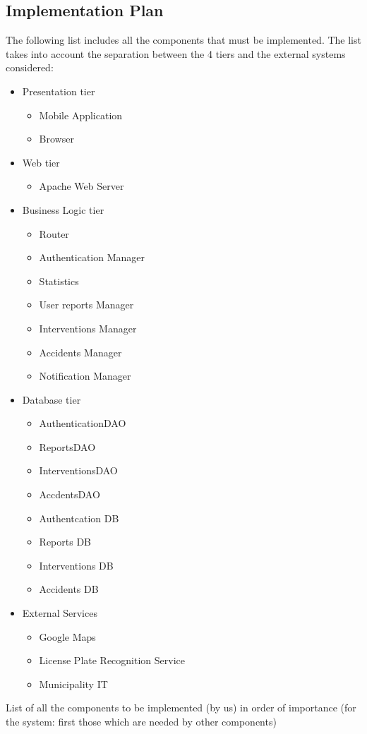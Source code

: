 \documentclass[../DD.tex]{subfiles}
\begin{document}
\subsection{Implementation Plan\label{5.2.1}}
The following list includes all the components that must be implemented. The list takes into account the separation between the 4 tiers and the external systems considered:
\begin{itemize}
	\item Presentation tier
	\begin{itemize}
		\item Mobile Application
		\item Browser
	\end{itemize}
\item Web tier
	\begin{itemize}
		\item Apache Web Server
	\end{itemize}
\item Business Logic tier
	\begin{itemize}
		\item Router
		\item Authentication Manager
		\item Statistics
		\item User reports Manager
		\item Interventions Manager
		\item Accidents Manager
		\item Notification Manager
	\end{itemize}
\item Database tier
	\begin{itemize}
		\item AuthenticationDAO
		\item ReportsDAO
		\item InterventionsDAO
		\item AccdentsDAO
		\item Authentcation DB
		\item Reports DB
		\item Interventions DB
		\item Accidents DB
	\end{itemize}
\item External Services
	\begin{itemize}
		\item Google Maps
		\item License Plate Recognition Service
		\item Municipality IT
	\end{itemize}
	
\end{itemize}
List of all the components to be implemented (by us) in order of importance (for the system: first those which are needed by other components)
\end{document}
